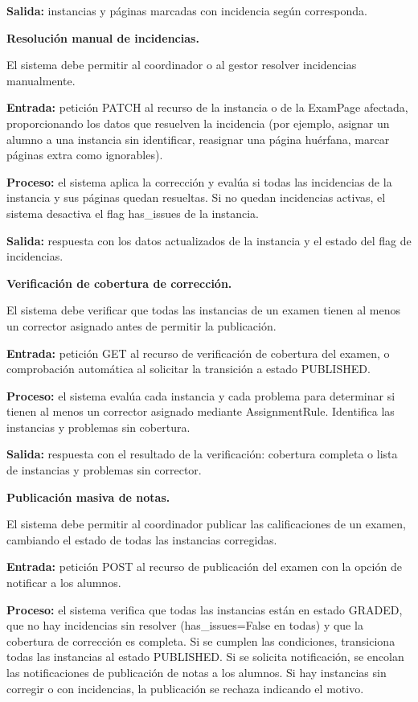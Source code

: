 \begin{functional}
\begin{functional}
    \textbf{Salida:} instancias y páginas marcadas con incidencia según corresponda.

    \item \textbf{Resolución manual de incidencias.}

    El sistema debe permitir al coordinador o al gestor resolver incidencias manualmente.

    \textbf{Entrada:} petición PATCH al recurso de la instancia o de la ExamPage afectada, proporcionando los datos que resuelven la incidencia (por ejemplo, asignar un alumno a una instancia sin identificar, reasignar una página huérfana, marcar páginas extra como ignorables).

    \textbf{Proceso:} el sistema aplica la corrección y evalúa si todas las incidencias de la instancia y sus páginas quedan resueltas. Si no quedan incidencias activas, el sistema desactiva el flag has\_issues de la instancia.

    \textbf{Salida:} respuesta con los datos actualizados de la instancia y el estado del flag de incidencias.

    \item \textbf{Verificación de cobertura de corrección.}

    El sistema debe verificar que todas las instancias de un examen tienen al menos un corrector asignado antes de permitir la publicación.

    \textbf{Entrada:} petición GET al recurso de verificación de cobertura del examen, o comprobación automática al solicitar la transición a estado PUBLISHED.

    \textbf{Proceso:} el sistema evalúa cada instancia y cada problema para determinar si tienen al menos un corrector asignado mediante AssignmentRule. Identifica las instancias y problemas sin cobertura.

    \textbf{Salida:} respuesta con el resultado de la verificación: cobertura completa o lista de instancias y problemas sin corrector.

    \item \textbf{Publicación masiva de notas.}

    El sistema debe permitir al coordinador publicar las calificaciones de un examen, cambiando el estado de todas las instancias corregidas.

    \textbf{Entrada:} petición POST al recurso de publicación del examen con la opción de notificar a los alumnos.

    \textbf{Proceso:} el sistema verifica que todas las instancias están en estado GRADED, que no hay incidencias sin resolver (has\_issues=False en todas) y que la cobertura de corrección es completa. Si se cumplen las condiciones, transiciona todas las instancias al estado PUBLISHED. Si se solicita notificación, se encolan las notificaciones de publicación de notas a los alumnos. Si hay instancias sin corregir o con incidencias, la publicación se rechaza indicando el motivo.


\end{functional}
\end{functional}
